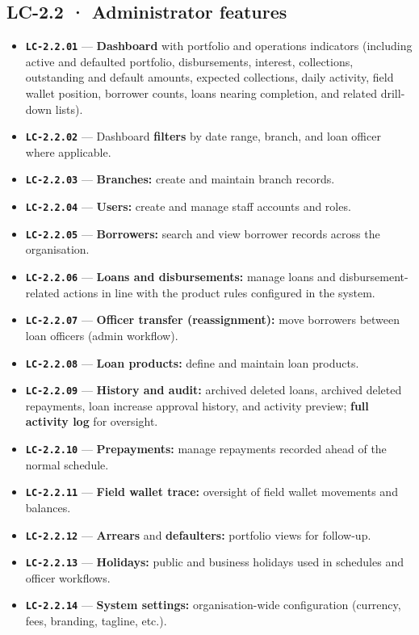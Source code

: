\documentclass[11pt,a4paper]{article}
\newcommand{\LC}[1]{\textbf{\texttt{#1}}}
\begin{document}
\subsection*{LC-2.2 · Administrator features}
\begin{itemize}
  \item \LC{LC-2.2.01} --- \textbf{Dashboard} with portfolio and operations indicators (including active and defaulted portfolio, disbursements, interest, collections, outstanding and default amounts, expected collections, daily activity, field wallet position, borrower counts, loans nearing completion, and related drill-down lists).
  \item \LC{LC-2.2.02} --- Dashboard \textbf{filters} by date range, branch, and loan officer where applicable.
  \item \LC{LC-2.2.03} --- \textbf{Branches:} create and maintain branch records.
  \item \LC{LC-2.2.04} --- \textbf{Users:} create and manage staff accounts and roles.
  \item \LC{LC-2.2.05} --- \textbf{Borrowers:} search and view borrower records across the organisation.
  \item \LC{LC-2.2.06} --- \textbf{Loans and disbursements:} manage loans and disbursement-related actions in line with the product rules configured in the system.
  \item \LC{LC-2.2.07} --- \textbf{Officer transfer (reassignment):} move borrowers between loan officers (admin workflow).
  \item \LC{LC-2.2.08} --- \textbf{Loan products:} define and maintain loan products.
  \item \LC{LC-2.2.09} --- \textbf{History and audit:} archived deleted loans, archived deleted repayments, loan increase approval history, and activity preview; \textbf{full activity log} for oversight.
  \item \LC{LC-2.2.10} --- \textbf{Prepayments:} manage repayments recorded ahead of the normal schedule.
  \item \LC{LC-2.2.11} --- \textbf{Field wallet trace:} oversight of field wallet movements and balances.
  \item \LC{LC-2.2.12} --- \textbf{Arrears} and \textbf{defaulters:} portfolio views for follow-up.
  \item \LC{LC-2.2.13} --- \textbf{Holidays:} public and business holidays used in schedules and officer workflows.
  \item \LC{LC-2.2.14} --- \textbf{System settings:} organisation-wide configuration (currency, fees, branding, tagline, etc.).
\end{itemize}
\end{document}
